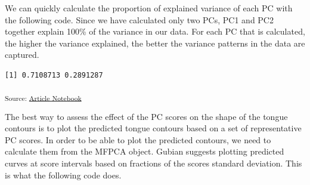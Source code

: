 \documentclass[
]{interact}
\newenvironment{Shaded}{\begin{snugshade}}{\end{snugshade}}
\newcommand{\CommentTok}[1]{\textcolor[rgb]{0.37,0.37,0.37}{#1}}
\newcommand{\FunctionTok}[1]{\textcolor[rgb]{0.28,0.35,0.67}{#1}}
\newcommand{\NormalTok}[1]{\textcolor[rgb]{0.00,0.23,0.31}{#1}}
\newcommand{\SpecialCharTok}[1]{\textcolor[rgb]{0.37,0.37,0.37}{#1}}
\begin{document}
We can quickly calculate the proportion of explained variance of each PC
with the following code. Since we have calculated only two PCs, PC1 and
PC2 together explain 100\% of the variance in our data. For each PC that
is calculated, the higher the variance explained, the better the
variance patterns in the data are captured.

\begin{Shaded}
\end{Shaded}

\begin{verbatim}
[1] 0.7108713 0.2891287
\end{verbatim}

\textsubscript{Source:
\href{https://stefanocoretta.github.io/mv_uti/index.qmd.html}{Article
Notebook}}

The best way to assess the effect of the PC scores on the shape of the
tongue contours is to plot the predicted tongue contours based on a set
of representative PC scores. In order to be able to plot the predicted
contours, we need to calculate them from the MFPCA object. Gubian
suggests plotting predicted curves at score intervals based on fractions
of the scores standard deviation. This is what the following code does.
\end{document}
